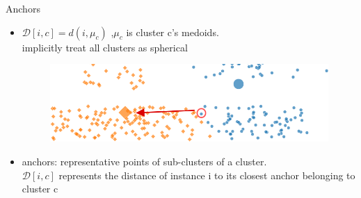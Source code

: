 \documentclass{beamer}
\begin{document}
\begin{frame}{Anchors}
    \begin{itemize}
        \item $\mathcal{D}[i,c]=d(i,\mu_c)$ ,$\mu_c$ is cluster c's medoids.\\
        implicitly treat all clusters as spherical
        \begin{figure}
            \centering
            \includegraphics[width=0.8\linewidth]{./images/medoids.png}
        \end{figure}
        \item anchors: representative points of sub-clusters of a cluster.\\
        $\mathcal{D}[i,c]$ represents the distance of instance i to its closest anchor belonging to cluster c
    \end{itemize}




\end{frame}
\end{document}
